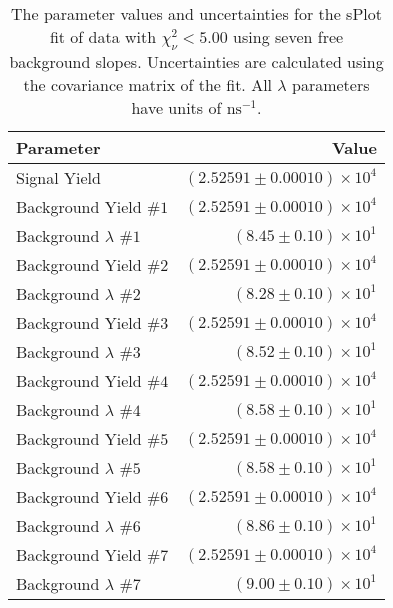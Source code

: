 
\begin{table}[h]
    \begin{center}
        \begin{tabular}{lr}\toprule
            Parameter & Value \\\midrule
            Signal Yield & $(2.52591 \pm 0.00010) \times 10^{4}$ \\
            Background Yield $\#1$ & $(2.52591 \pm 0.00010) \times 10^{4}$ \\
            Background $\lambda$ $\#1$ & $(8.45 \pm 0.10) \times 10^{1}$ \\
            Background Yield $\#2$ & $(2.52591 \pm 0.00010) \times 10^{4}$ \\
            Background $\lambda$ $\#2$ & $(8.28 \pm 0.10) \times 10^{1}$ \\
            Background Yield $\#3$ & $(2.52591 \pm 0.00010) \times 10^{4}$ \\
            Background $\lambda$ $\#3$ & $(8.52 \pm 0.10) \times 10^{1}$ \\
            Background Yield $\#4$ & $(2.52591 \pm 0.00010) \times 10^{4}$ \\
            Background $\lambda$ $\#4$ & $(8.58 \pm 0.10) \times 10^{1}$ \\
            Background Yield $\#5$ & $(2.52591 \pm 0.00010) \times 10^{4}$ \\
            Background $\lambda$ $\#5$ & $(8.58 \pm 0.10) \times 10^{1}$ \\
            Background Yield $\#6$ & $(2.52591 \pm 0.00010) \times 10^{4}$ \\
            Background $\lambda$ $\#6$ & $(8.86 \pm 0.10) \times 10^{1}$ \\
            Background Yield $\#7$ & $(2.52591 \pm 0.00010) \times 10^{4}$ \\
            Background $\lambda$ $\#7$ & $(9.00 \pm 0.10) \times 10^{1}$ \\\bottomrule
        \end{tabular}
        \caption{The parameter values and uncertainties for the sPlot fit of data with $\chi^2_\nu < 5.00$ using seven free background slopes. Uncertainties are calculated using the covariance matrix of the fit. All $\lambda$ parameters have units of $\si{\nano\second}^{-1}$.}
    \end{center}
\end{table}
